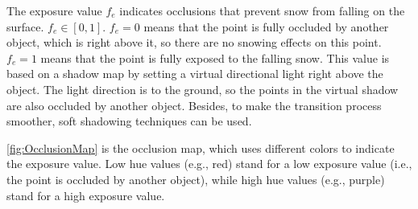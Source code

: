 \documentclass{article}
\begin{document}
The exposure value \( f_{e} \) indicates occlusions that prevent snow from falling on the surface. %
\( f_{e} \in [0, 1] \). \( f_{e}=0 \) means that the point is fully occluded by another object, which is right 
above it, so there are no snowing effects on this point. \( f_{e}=1 \) means that the point is fully exposed to the 
falling snow. This value is based on a shadow map by setting a virtual directional light right above the object. 
The light direction is to the ground, so the points in the virtual shadow are also occluded by another object. 
Besides, to make the transition process smoother, soft shadowing techniques can be used. 

\ref{fig:OcclusionMap} is the occlusion map, which uses different colors to indicate the exposure value. Low hue 
values (e.g., red) stand for a low exposure value (i.e., the point is occluded by another object), while high hue
values (e.g., purple) stand for a high exposure value.
\end{document}
